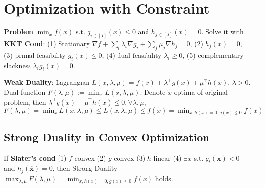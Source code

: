 \section{Optimization with Constraint}

\textbf{Problem} $\min_{x} f(x)$ s.t. $g_{i\in [I]}(x)\leq 0$ and $h_{j\in[J]}(x)=0$. 
Solve it with \textbf{KKT Cond}: (1) Stationary $\nabla f + \sum_{i}\lambda_i\nabla g_i + \sum_j \mu_j \nabla h_j = 0$, (2) $h_j(x) = 0$, (3) primal feasibility $g_i(x)\leq 0$, (4) dual feasibility $\lambda_i\geq 0$, (5) complementary slackness $\lambda_i g_i(x) = 0$.

\textbf{Weak Duality}: Lagrangian $L(x,\lambda,\mu) = f(x)+\lambda^{\top}g(x) + \mu^{\top}h(x)$, $\lambda > 0$. Dual function $F(\lambda,\mu):=\min_x L(x,\lambda,\mu)$. Denote $\tilde{x}$ optima of original problem, then $\lambda^{\top}g(\tilde{x})+\mu^{\top}h(\tilde{x})\leq 0, \forall \lambda,\mu$, $F(\lambda,\mu) = \min_x L(x,\lambda,\mu)\leq L(\tilde{x},\lambda,\mu)\leq f(\tilde{x})=\min_{x,h(x)=0,g(x)\leq0} f(x)$

\subsection*{Strong Duality in Convex Optimization} 
If \textbf{Slater's cond} (1) $f$ convex (2) $g$ convex (3) $h$ linear (4) $\exists \bar{x}$ s.t. $g_{i}(\overline{\mathbf{x}})<0$ and $h_{j}(\overline{\mathbf{x}})=0$, then Strong Duality $\max_{\lambda,\mu} F(\lambda,\mu) = \min_{x,h(x)=0,g(x)\leq0} f(x)$ holds.






